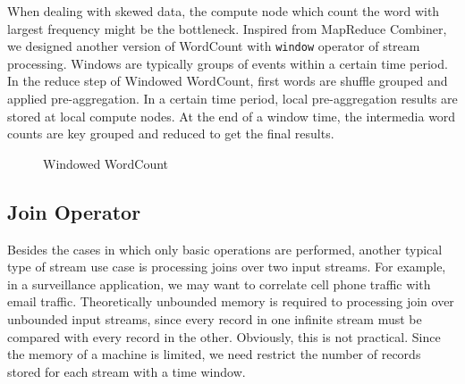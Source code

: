 When dealing with skewed data, the compute node which count the word with largest frequency might be the bottleneck. Inspired from MapReduce Combiner, we designed another version of WordCount with \texttt{window} operator of stream processing. Windows are typically groups of events within a certain time period. In the reduce step of Windowed WordCount, first words are shuffle grouped and applied pre-aggregation. In a certain time period, local pre-aggregation results are stored at local compute nodes. At the end of a window time, the intermedia word counts are key grouped and reduced to get the final results.

\begin{figure}
  \begin{center}
   \caption{Windowed WordCount}
   \label{fig:windowed_wordcount}
  \end{center}
\end{figure}


\subsection{Join Operator}
\label{sub:join_operator}

Besides the cases in which only basic operations are performed, another typical type of stream use case is processing joins over two input streams. For example, in a surveillance application, we may want to correlate cell phone traffic with email traffic. Theoretically unbounded memory is required to processing join over unbounded input streams, since every record in one infinite stream must be compared with every record in the other. Obviously, this is not practical\cite{window-join}. Since the memory of a machine is limited, we need restrict the number of records stored for each stream with a time window. 

